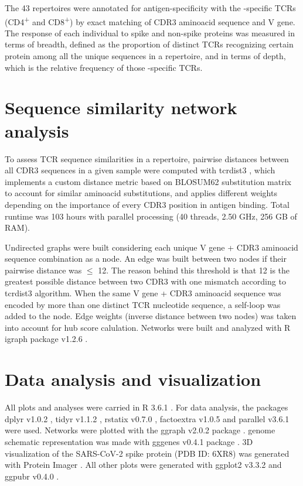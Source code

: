 The 43 \TCRB{} repertoires were annotated for antigen-specificity with the \covid-specific TCRs (CD4\textsuperscript{+} and CD8\textsuperscript{+}) by exact matching of CDR3 aminoacid sequence and V gene. The \covid{} response of each individual to spike and non-spike proteins was measured in terms of breadth, defined as the proportion of distinct TCRs recognizing certain protein among all the unique sequences in a repertoire, and in terms of depth, which is the relative frequency of those \covid-specific TCRs.



\section*{Sequence similarity network analysis}


To assess TCR sequence similarities in a repertoire, pairwise distances between all CDR3 sequences in a given sample were computed with tcrdist3 \citep{metaclonotypes, tcrdist}, which implements a custom distance metric based on BLOSUM62 substitution matrix to account for similar aminoacid substitutions, and applies different weights depending on the importance of every CDR3 position in antigen binding. Total runtime was 103 hours with parallel processing (40 threads, 2.50 GHz, 256 GB of RAM).

Undirected graphs were built considering each unique V gene + CDR3 aminoacid sequence combination as a node. An edge was built between two nodes if their pairwise distance was $\leq$ 12. The reason behind this threshold is that 12 is the greatest possible distance between two CDR3 with one mismatch according to tcrdist3 algorithm. When the same V gene + CDR3 aminoacid sequence was encoded by more than one distinct TCR nucleotide sequence, a self-loop was added to the node. Edge weights (inverse distance between two nodes) was taken into account for hub score calulation. Networks were built and analyzed with R igraph package v1.2.6 \citep{igraph}.

\section*{Data analysis and visualization}


All plots and analyses were carried in R 3.6.1 \citep{r}. For data analysis, the packages dplyr v1.0.2 \citep{dplyr}, tidyr v1.1.2 \citep{tidyr}, rstatix v0.7.0 \citep{rstatix}, factoextra v1.0.5 \citep{factoextra} and parallel v3.6.1 \citep{r} were used. Networks were plotted with the ggraph v2.0.2 package \citep{ggraph}. \covid{} genome schematic representation was made with gggenes v0.4.1 package \citep{gggenes}. 3D visualization of the SARS-CoV-2 spike protein (PDB ID: 6XR8) was generated with Protein Imager \citep{proteinimager}. All other plots were generated with ggplot2 v3.3.2 \citep{ggplot2} and ggpubr v0.4.0 \citep{ggpubr}.


